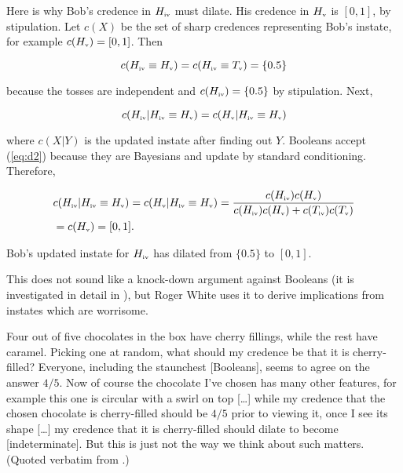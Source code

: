 \documentclass[11pt]{article}
\begin{document}
Here is why Bob's credence in $H_{\mbox{\tiny{iv}}}$ must dilate. His
credence in $H_{\mbox{\tiny{v}}}$ is $[0,1]$, by stipulation. Let
$c(X)$ be the set of sharp credences representing Bob's instate, for
example $c(H_{\mbox{\tiny{v}}})=[0,1]$. Then

\begin{equation}
  \label{eq:d1}
  c(H_{\mbox{\tiny{iv}}}\equiv{}H_{\mbox{\tiny{v}}})=c(H_{\mbox{\tiny{iv}}}\equiv{}T_{\mbox{\tiny{v}}})=\{0.5\}
\end{equation}

because the tosses are independent and
$c(H_{\mbox{\tiny{iv}}})=\{0.5\}$ by stipulation. Next,

\begin{equation}
  \label{eq:d2}
  c(H_{\mbox{\tiny{iv}}}|H_{\mbox{\tiny{iv}}}\equiv{}H_{\mbox{\tiny{v}}})=c(H_{\mbox{\tiny{v}}}|H_{\mbox{\tiny{iv}}}\equiv{}H_{\mbox{\tiny{v}}})
\end{equation}

where $c(X|Y)$ is the updated instate after finding out $Y$. Booleans
accept (\ref{eq:d2}) because they are Bayesians and update by standard
conditioning. Therefore,

\begin{align}
  \label{eq:d3}
  &c(H_{\mbox{\tiny{iv}}}|H_{\mbox{\tiny{iv}}}\equiv{}H_{\mbox{\tiny{v}}})=c(H_{\mbox{\tiny{v}}}|H_{\mbox{\tiny{iv}}}\equiv{}H_{\mbox{\tiny{v}}})=\frac{c(H_{\mbox{\tiny{iv}}})c(H_{\mbox{\tiny{v}}})}{c(H_{\mbox{\tiny{iv}}})c(H_{\mbox{\tiny{v}}})+c(T_{\mbox{\tiny{iv}}})c(T_{\mbox{\tiny{v}}})} \notag \\
  &=c(H_{\mbox{\tiny{v}}})=[0,1].
\end{align}

Bob's updated instate for $H_{\mbox{\tiny{iv}}}$ has dilated from
$\{0.5\}$ to $[0,1]$.

This does not sound like a knock-down argument against Booleans (it is
investigated in detail in ), but
Roger White uses it to derive implications from instates which are
worrisome.

\begin{quotex}
  \label{ex:chocolates} Four out of five
  chocolates in the box have cherry fillings, while the rest have
  caramel. Picking one at random, what should my credence be that it
  is cherry-filled? Everyone, including the staunchest [Booleans],
  seems to agree on the answer $4/5$. Now of course the chocolate I've
  chosen has many other features, for example this one is circular
  with a swirl on top [{\ldots}] while my credence that the chosen
  chocolate is cherry-filled should be $4/5$ prior to viewing it, once
  I see its shape [{\ldots}] my credence that it is cherry-filled
  should dilate to become [indeterminate]. But this is just not the
  way we think about such matters. (Quoted verbatim from
  .)
\end{quotex}
\end{document}
